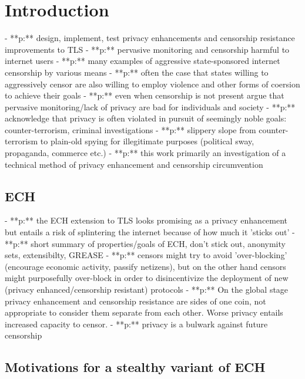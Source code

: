 \chapter{Introduction}
  - **p:** design, implement, test privacy enhancements and censorship resistance improvements to TLS
  - **p:** pervasive monitoring and censorship harmful to internet users
  - **p:** many examples of aggressive state-sponsored internet censorship by various means
  - **p:** often the case that states willing to aggressively censor are also willing to employ violence and other forms of coersion to achieve their goals
  - **p:** even when censorship is not present argue that pervasive monitoring/lack of privacy are bad for individuals and society
  - **p:** acknowledge that privacy is often violated in pursuit of seemingly noble goals: counter-terrorism, criminal investigations
  - **p:** slippery slope from counter-terrorism to plain-old spying for illegitimate purposes (political sway, propaganda, commerce etc.)
  - **p:** this work primarily an investigation of a technical method of privacy enhancement and censorship circumvention

\section{ECH}
  - **p:** the ECH extension to TLS looks promising as a privacy enhancement but entails a risk of splintering the internet because of how much it 'sticks out'
  - **p:** short summary of properties/goals of ECH, don't stick out, anonymity sets, extensibilty, GREASE
  - **p:** censors might try to avoid 'over-blocking' (encourage economic activity, passify netizens), but on the other hand censors might purposefully over-block in order to disincentivize the deployment of new (privacy enhanced/censorship resistant) protocols
  - **p:** On the global stage privacy enhancement and censorship resistance are sides of one coin, not appropriate to consider them separate from each other. Worse privacy entails increased capacity to censor.
  - **p:** privacy is a bulwark against future censorship

\section{Motivations for a stealthy variant of ECH}



